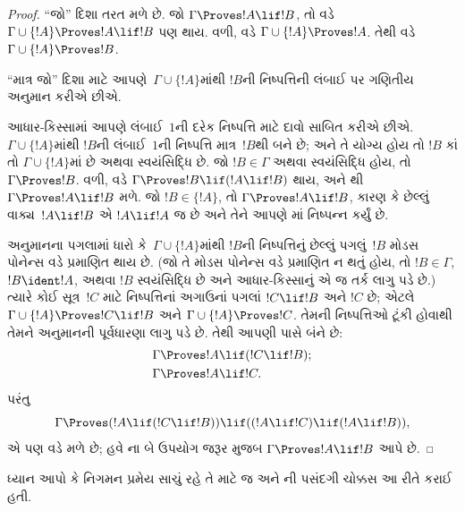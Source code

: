 \begin{proof}
``જો'' દિશા તરત મળે છે. જો $\Gamma \Proves !A \lif !B$, તો
 વડે $\Gamma \cup \{!A\} \Proves !A \lif
!B$ પણ થાય. વળી,  વડે
$\Gamma \cup \{!A\} \Proves !A$. તેથી  વડે
$\Gamma \cup \{!A\} \Proves !B$.

``માત્ર જો'' દિશા માટે આપણે~$\Gamma \cup \{!A\}$માંથી $!B$ની
નિષ્પત્તિની લંબાઈ પર ગણિતીય અનુમાન કરીએ છીએ.

આધાર-કિસ્સામાં આપણે લંબાઈ~$1$ની દરેક નિષ્પત્તિ માટે દાવો સાબિત
કરીએ છીએ. $\Gamma \cup \{!A\}$માંથી $!B$ની લંબાઈ~$1$ની
નિષ્પત્તિ માત્ર~$!B$થી બને છે; અને તે યોગ્ય હોય તો $!B$ કાં તો
$\Gamma \cup \{!A\}$માં છે અથવા સ્વયંસિદ્ધિ છે. જો $!B \in \Gamma$
અથવા સ્વયંસિદ્ધિ હોય, તો $\Gamma \Proves !B$. વળી,
 વડે $\Gamma \Proves !B \lif (!A \lif !B)$ થાય,
અને થી $\Gamma \Proves !A \lif !B$ મળે. જો
$!B \in \{!A\}$, તો $\Gamma \Proves !A \lif !B$, કારણ કે છેલ્લું
વાક્ય~$!A \lif !B$ એ $!A \lif !A$ જ છે અને તેને આપણે
માં નિષ્પન્ન કર્યું છે.


અનુમાનના પગલામાં ધારો કે~$\Gamma \cup \{!A\}$માંથી $!B$ની
નિષ્પત્તિનું છેલ્લું પગલું~$!B$ મોડસ પોનેન્સ વડે પ્રમાણિત થાય છે.
(જો તે મોડસ પોનેન્સ વડે પ્રમાણિત ન થતું હોય, તો $!B \in \Gamma$,
$!B \ident !A$, અથવા $!B$ સ્વયંસિદ્ધિ છે અને આધાર-કિસ્સાનું એ જ તર્ક
લાગુ પડે છે.) ત્યારે કોઈ સૂત્ર~$!C$ માટે નિષ્પત્તિનાં અગાઉનાં
પગલાં $!C \lif !B$ અને $!C$ છે; એટલે
$\Gamma \cup \{!A\} \Proves !C \lif !B$ અને
$\Gamma \cup \{!A\} \Proves !C$. તેમની નિષ્પત્તિઓ ટૂંકી હોવાથી
તેમને અનુમાનની પૂર્વધારણા લાગુ પડે છે. તેથી આપણી પાસે બંને છે:
\begin{align*}
  & \Gamma \Proves !A \lif (!C \lif !B); \\
  & \Gamma \Proves !A \lif !C.
\end{align*}
પરંતુ
\[
\Gamma \Proves (!A \lif (!C \lif !B)) \lif
((!A\lif !C)  \lif (!A \lif !B)),
\]
એ પણ  વડે મળે છે; હવે ના બે ઉપયોગ
જરૂર મુજબ $\Gamma \Proves !A \lif !B$ આપે છે.
\end{proof}

ધ્યાન આપો કે નિગમન પ્રમેય સાચું રહે તે માટે જ
 અને ની પસંદગી ચોક્કસ આ રીતે
કરાઈ હતી.

